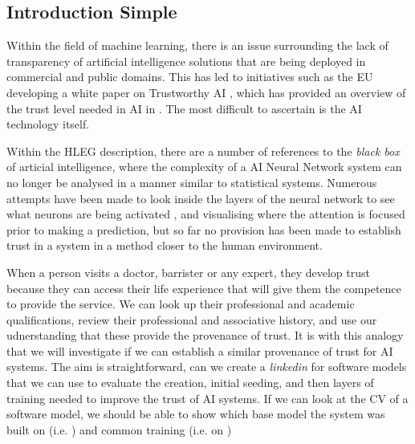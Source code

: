 \subsection{Introduction Simple}
Within the field of machine learning, there is an issue surrounding the lack of transparency of artificial intelligence solutions that are being deployed in commercial and public domains. This has led to initiatives such as the EU developing a white paper on Trustworthy AI \cite{high-level_expert_group_on_ai_ethics_2019}, which has provided an overview of the trust level needed in AI in \cite{ryan_ai_2020}. The most difficult to ascertain is the AI technology itself.

Within the HLEG description, there are a number of references to the \textit{black box} of articial intelligence, where the complexity of a AI Neural Network system can no longer be analysed in a manner similar to statistical systems. Numerous attempts have been made to look inside the layers of the neural network to see what neurons are being activated \cite{kim_interpretability_2018}, and visualising where the attention is focused prior to making a prediction, but so far no provision has been made to establish trust in a system in a method closer to the human environment.

When a person visits a doctor, barrister or any expert, they develop trust because they can access their life experience that will give them the competence to provide the service. We can look up their professional and academic qualifications, review their professional and associative history, and use our udnerstanding that these provide the provenance of trust. It is with this analogy that we will investigate if we can establish a similar provenance of trust for AI systems. The aim is straightforward, can we create a \textit{linkedin} for software models that we can use to evaluate the creation, initial seeding, and then layers of training needed to improve the trust of AI systems. If we can look at the CV of a software model, we should be able to show which base model the system was built on (i.e.  \cite{noauthor_151203385_nodate}) and common training (i.e. on \cite{deng_imagenet_2009})